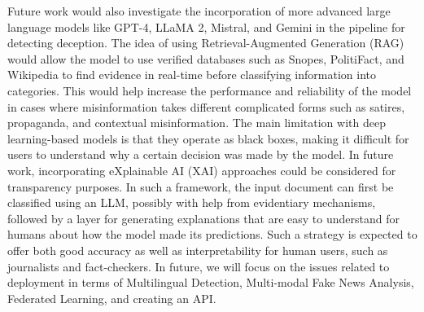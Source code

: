 \documentclass[runningheads]{llncs}
\begin{document}
Future work would also investigate the incorporation of more advanced large language models like GPT-4, LLaMA 2, Mistral, and Gemini in the pipeline for detecting deception. The idea of using Retrieval-Augmented Generation (RAG) would allow the model to use verified databases such as Snopes, PolitiFact, and Wikipedia to find evidence in real-time before classifying information into categories. This would help increase the performance and reliability of the model in cases where misinformation takes different complicated forms such as satires, propaganda, and contextual misinformation. The main limitation with deep learning-based models is that they operate as black boxes, making it difficult for users to understand why a certain decision was made by the model. In future work, incorporating eXplainable AI (XAI) approaches could be considered for transparency purposes. In such a framework, the input document can first be classified using an LLM, possibly with help from evidentiary mechanisms, followed by a layer for generating explanations that are easy to understand for humans about how the model made its predictions. Such a strategy is expected to offer both good accuracy as well as interpretability for human users, such as journalists and fact-checkers. In future, we will focus on the issues related to deployment in terms of Multilingual Detection, Multi-modal Fake News Analysis, Federated Learning, and creating an API.


\end{document}
